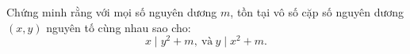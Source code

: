 \ifshowproblem
\begin{problem}\label{problem:BGR-2015-EGMO-TST-P4}
	Chứng minh rằng với mọi số nguyên dương \( m \), tồn tại vô số cặp số nguyên dương \( (x, y) \) nguyên tố cùng nhau sao cho:
	\[ x \mid y^2 + m,\ \text{và}\ y \mid x^2 + m. \]
\end{problem}
\fi

\footnotemark
{}
\fi